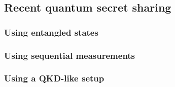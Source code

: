 
\subsection*{Recent quantum secret sharing}

\subsubsection*{Using entangled states}
\subsubsection*{Using sequential measurements}
\subsubsection*{Using a QKD-like setup}